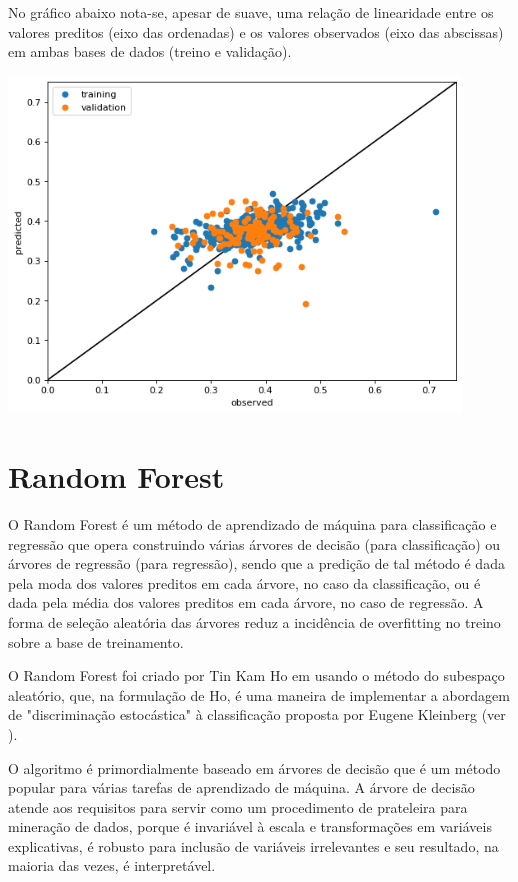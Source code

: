 No gráfico abaixo nota-se, apesar de suave, uma relação de linearidade entre os valores preditos (eixo das ordenadas) e os valores observados (eixo das abscissas) em ambas bases de dados (treino e validação).

\graphicspath{ {./figuras/model_performance/} }
\begin{center}
\includegraphics[width=12.0cm, keepaspectratio]{cap3_scatter_reg_lin}
\label{ape:cap3_scatter_reg_lin}
\end{center}

\section{Random Forest}
\label{sec:random_forest}

O Random Forest é um método de aprendizado de máquina para classificação e regressão que opera construindo várias árvores de decisão (para classificação) ou árvores de regressão (para regressão), sendo que a predição de tal método é dada pela moda dos valores preditos em cada árvore, no caso da classificação, ou é dada pela média dos valores preditos em cada árvore, no caso de regressão. A forma de seleção aleatória das árvores reduz a incidência de overfitting no treino sobre a base de treinamento.

O Random Forest foi criado por Tin Kam Ho em \citet{Ho1995} usando o método do subespaço aleatório, que, na formulação de Ho, é uma maneira de implementar a abordagem de "discriminação estocástica" à classificação proposta por Eugene Kleinberg (ver \citet{Kleinberg1990}).

O algoritmo é primordialmente baseado em árvores de decisão que é um método popular para várias tarefas de aprendizado de máquina. A árvore de decisão atende aos requisitos para servir como um procedimento de prateleira para mineração de dados, porque é invariável à escala e transformações em variáveis explicativas, é robusto para inclusão de variáveis irrelevantes e seu resultado, na maioria das vezes, é interpretável.

